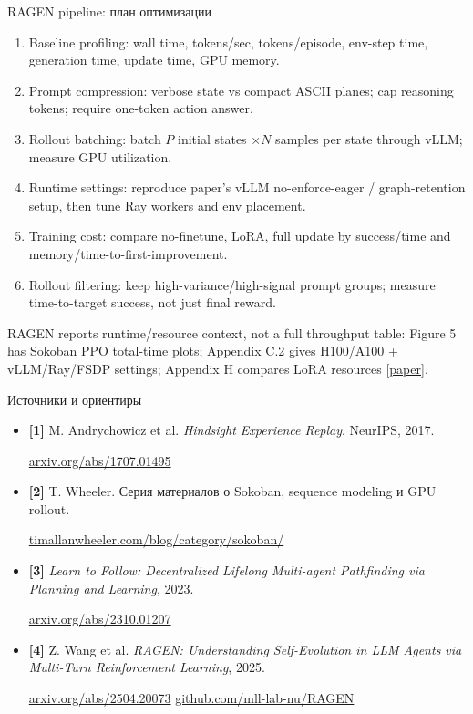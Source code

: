 \documentclass[aspectratio=169]{beamer}
\begin{document}
\begin{frame}{RAGEN pipeline: план оптимизации}
  \small
  \begin{enumerate}
    \item Baseline profiling: wall time, tokens/sec, tokens/episode, env-step time, generation time, update time, GPU memory.
    \item Prompt compression: verbose state vs compact ASCII planes; cap reasoning tokens; require one-token action answer.
    \item Rollout batching: batch \(P\) initial states \(\times N\) samples per state through vLLM; measure GPU utilization.
    \item Runtime settings: reproduce paper's vLLM no-enforce-eager / graph-retention setup, then tune Ray workers and env placement.
    \item Training cost: compare no-finetune, LoRA, full update by success/time and memory/time-to-first-improvement.
    \item Rollout filtering: keep high-variance/high-signal prompt groups; measure time-to-target success, not just final reward.
  \end{enumerate}

  \vspace{0.25em}
  \scriptsize
  RAGEN reports runtime/resource context, not a full throughput table: Figure 5 has Sokoban PPO total-time plots; Appendix C.2 gives H100/A100 + vLLM/Ray/FSDP settings; Appendix H compares LoRA resources \href{https://arxiv.org/pdf/2504.20073}{[paper]}.
\end{frame}

\begin{frame}{Источники и ориентиры}
  \small
  \begin{itemize}
    \item \textbf{[1]} M. Andrychowicz et al. \textit{Hindsight Experience Replay}. NeurIPS, 2017.
    
    \href{https://arxiv.org/abs/1707.01495}{arxiv.org/abs/1707.01495}

    \item \textbf{[2]} T. Wheeler. Серия материалов о Sokoban, sequence modeling и GPU rollout.
    
    \href{https://timallanwheeler.com/blog/category/sokoban/}{timallanwheeler.com/blog/category/sokoban/}

    \item \textbf{[3]} \textit{Learn to Follow: Decentralized Lifelong Multi-agent Pathfinding via Planning and Learning}, 2023.
    
    \href{https://arxiv.org/abs/2310.01207}{arxiv.org/abs/2310.01207}

    \item \textbf{[4]} Z. Wang et al. \textit{RAGEN: Understanding Self-Evolution in LLM Agents via Multi-Turn Reinforcement Learning}, 2025.

    \href{https://arxiv.org/abs/2504.20073}{arxiv.org/abs/2504.20073}
    \quad
    \href{https://github.com/mll-lab-nu/RAGEN}{github.com/mll-lab-nu/RAGEN}
  \end{itemize}

\end{frame}
\end{document}
